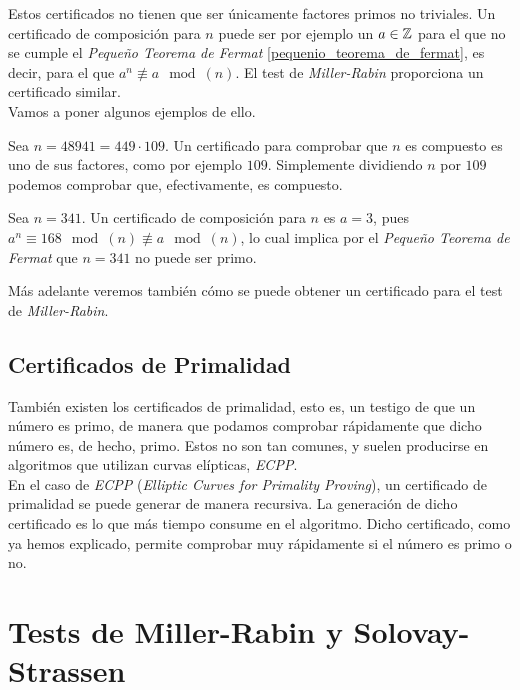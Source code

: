 Estos certificados no tienen que ser únicamente factores primos no triviales. Un certificado de composición para $n$ puede ser por ejemplo un $a \in \mathbb{Z}$ para el que no se cumple el \textit{Pequeño Teorema de Fermat} \ref{pequenio_teorema_de_fermat}, es decir, para el que $a^n \not\equiv a \mod(n)$. El test de \textit{Miller-Rabin} proporciona un certificado similar.\\

Vamos a poner algunos ejemplos de ello.

\begin{ejemplo}
	Sea $n = 48941 = 449\cdot109$. Un certificado para comprobar que $n$ es compuesto es uno de sus factores, como por ejemplo $109$. Simplemente dividiendo $n$ por $109$ podemos comprobar que, efectivamente, es compuesto.
\end{ejemplo}

\begin{ejemplo}
	Sea $n = 341$. Un certificado de composición para $n$ es $a = 3$, pues $a^n \equiv 168 \mod(n) \not\equiv a \mod(n)$, lo cual implica por el \textit{Pequeño Teorema de Fermat} que $n = 341$ no puede ser primo.
\end{ejemplo}

Más adelante veremos también cómo se puede obtener un certificado para el test de \textit{Miller-Rabin}.

\subsection{Certificados de Primalidad}

También existen los certificados de primalidad, esto es, un testigo de que un número es primo, de manera que podamos comprobar rápidamente que dicho número es, de hecho, primo. Estos no son tan comunes, y suelen producirse en algoritmos que utilizan curvas elípticas, \textit{ECPP}.\\

En el caso de \textit{ECPP} (\textit{Elliptic Curves for Primality Proving}), un certificado de primalidad se puede generar de manera recursiva. La generación de dicho certificado es lo que más tiempo consume en el algoritmo. Dicho certificado, como ya hemos explicado, permite comprobar muy rápidamente si el número es primo o no.

\section{Tests de Miller-Rabin y Solovay-Strassen}

